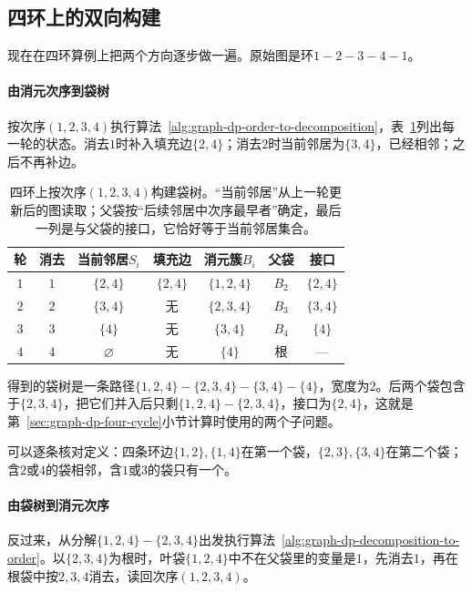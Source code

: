 \subsection{四环上的双向构建}
\label{sec:graph-dp-four-cycle-construction}

现在在四环算例上把两个方向逐步做一遍。原始图是环$1-2-3-4-1$。

\paragraph{由消元次序到袋树}
按次序$(1,2,3,4)$执行算法~\ref{alg:graph-dp-order-to-decomposition}，表~\ref{tab:graph-dp-four-cycle-construction}列出每一轮的状态。消去$1$时补入填充边$\{2,4\}$；消去$2$时当前邻居为$\{3,4\}$，已经相邻；之后不再补边。

\begin{table}[!htb]
  \centering
  \small
  \begin{tabular}{@{}ccccccc@{}}
    \toprule
    轮 & 消去 & 当前邻居$S_i$ & 填充边 & 消元簇$B_i$ & 父袋 & 接口\\
    \midrule
    $1$ & $1$ & $\{2,4\}$ & $\{2,4\}$ & $\{1,2,4\}$ & $B_2$ & $\{2,4\}$\\
    $2$ & $2$ & $\{3,4\}$ & 无 & $\{2,3,4\}$ & $B_3$ & $\{3,4\}$\\
    $3$ & $3$ & $\{4\}$ & 无 & $\{3,4\}$ & $B_4$ & $\{4\}$\\
    $4$ & $4$ & $\varnothing$ & 无 & $\{4\}$ & 根 & —\\
    \bottomrule
  \end{tabular}
  \caption{四环上按次序$(1,2,3,4)$构建袋树。“当前邻居”从上一轮更新后的图读取；父袋按“后续邻居中次序最早者”确定，最后一列是与父袋的接口，它恰好等于当前邻居集合。}
  \label{tab:graph-dp-four-cycle-construction}
\end{table}

得到的袋树是一条路径$\{1,2,4\}-\{2,3,4\}-\{3,4\}-\{4\}$，宽度为$2$。后两个袋包含于$\{2,3,4\}$，把它们并入后只剩$\{1,2,4\}-\{2,3,4\}$，接口为$\{2,4\}$，这就是第~\ref{sec:graph-dp-four-cycle}小节计算时使用的两个子问题。

可以逐条核对定义：四条环边$\{1,2\},\{1,4\}$在第一个袋，$\{2,3\},\{3,4\}$在第二个袋；含$2$或$4$的袋相邻，含$1$或$3$的袋只有一个。

\paragraph{由袋树到消元次序}
反过来，从分解$\{1,2,4\}-\{2,3,4\}$出发执行算法~\ref{alg:graph-dp-decomposition-to-order}。以$\{2,3,4\}$为根时，叶袋$\{1,2,4\}$中不在父袋里的变量是$1$，先消去$1$，再在根袋中按$2,3,4$消去，读回次序$(1,2,3,4)$。


